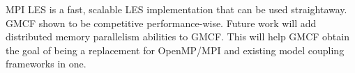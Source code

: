 MPI LES is a fast, scalable LES implementation that can be used straightaway.
GMCF shown to be competitive performance-wise. Future work will add distributed
memory parallelism abilities to GMCF. This will help GMCF obtain the goal of
being a replacement for OpenMP/MPI and existing model coupling frameworks in
one.
